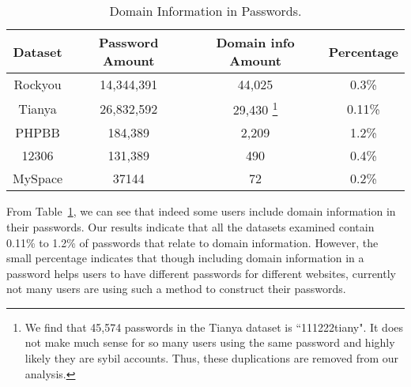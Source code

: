 \begin{table}[!]
\centering
\caption{Domain Information in Passwords.}
\begin{adjustbox}{max width=0.48\textwidth}
\begin{tabular}{|c|c|c|c|} \hline
Dataset & Password Amount & Domain info Amount & Percentage\\ \hline
Rockyou & 14,344,391 & 44,025 & 0.3\%\\ Tianya & 26,832,592 &
29,430{ \footnote{\small We find that 45,574 passwords in the Tianya
    dataset is ``111222tiany". It does not make much sense for so many
    users using the same password and highly likely they are sybil
    accounts. Thus, these duplications are removed from our analysis.}
} &0.11\%\\ PHPBB & 184,389 & 2,209 & 1.2\%\\ 12306 & 131,389 & 490 &
0.4\%\\ MySpace & 37144 & 72 & 0.2\%\\ \hline\end{tabular}
\end{adjustbox}
\label{t7}
\end{table}

From Table~\ref{t7}, we can see that indeed some users include domain
information in their passwords. Our results indicate that all the
datasets examined contain 0.11\% to 1.2\% of passwords that relate to
domain information. However, the small percentage indicates that
though including domain information in a password helps users to have
different passwords for different websites, currently not many users
are using such a method to construct their passwords.


